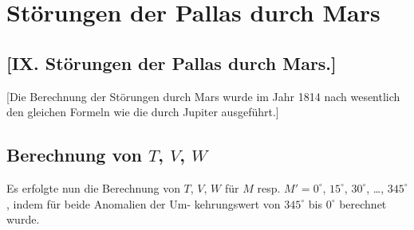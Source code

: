\documentclass[10pt,a4paper]{article}
\begin{document}
\newpage
\section*{Störungen der Pallas durch Mars}

\subsection*{[IX. Störungen der Pallas durch Mars.]}

[Die Berechnung der Störungen durch Mars wurde im Jahr 1814 nach wesentlich den 
gleichen Formeln wie die durch Jupiter ausgeführt.]

\newpage
\subsection*{Berechnung von $T$, $V$, $W$}

Es erfolgte nun die Berechnung von $T$, $V$, $W$ für $M$ resp. $M' = 0^{\circ}$, $15^{\circ}$, $30^{\circ}$, \ldots, $345^{\circ}$, 
indem für beide Anomalien der Um-
kehrungswert von $345^{\circ}$ bis $0^{\circ}$ berechnet wurde.
\end{document}
